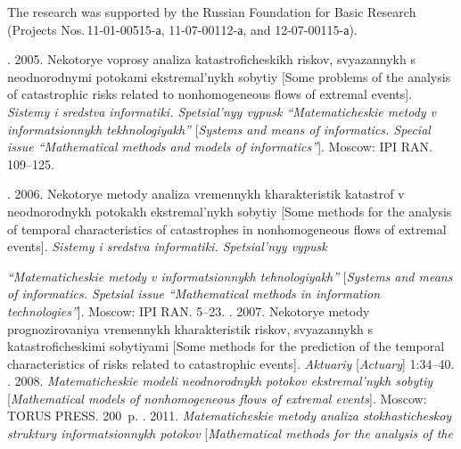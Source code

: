 \Ack
\noindent
The research was supported by the Russian Foundation for Basic Research (Projects 
Nos.\,11-01-00515-а, 11-07-00112-а, and 12-07-00115-а).


  \begin{multicols}{2}

\renewcommand{\bibname}{\protect\rmfamily References}

{\small\frenchspacing
{%
\begin{thebibliography}{99}

. 2005. 
Nekotorye voprosy analiza katastroficheskikh riskov, svyazannykh s neodnorodnymi 
potokami ekstremal'nykh sobytiy [Some problems of the analysis of catastrophic 
risks related to \mbox{nonhomogeneous} flows of extremal events]. 
\textit{Sistemy i sredstva informatiki. Spetsial'nyy vypusk 
``Matematicheskie metody v informatsionnykh tekhnologiyakh''}
[\textit{Systems and means of informatics. 
Special issue ``Mathematical methods and models of informatics''}]. 
Moscow: IPI RAN. 109--125.

. 
2006. Nekotorye metody analiza vremennykh kharakteristik katastrof v 
neodnorodnykh potokakh ekstremal'nykh sobytiy [Some methods for the 
analysis of temporal characteristics of catastrophes in nonhomogeneous 
flows of extremal
 events]. 
\textit{Sistemy i sredstva informatiki. Spetsial'nyy vypusk}\linebreak\vspace*{-12pt} 

\columnbreak

\noindent
\textit{``Matematicheskie metody v informatsionnykh tehnologiyakh''}
[\textit{Systems and means of informatics. Spetsial issue ``Mathematical 
methods in information technologies''}]. Moscow: IPI RAN. 5--23.
. 2007. 
Nekotorye metody prognozirovaniya vremennykh kha\-rak\-te\-ri\-stik riskov, svyazannykh s 
katastroficheskimi sobytiyami 
[Some methods for the prediction of the temporal characteristics of risks related 
to catastrophic events]. \textit{Aktuariy} [\textit{Actuary}] 1:34--40.
. 2008. 
\textit{Matema\-ti\-che\-skie modeli neodnorodnykh potokov ekstremal'nykh sobytiy} 
[\textit{Mathematical models of nonhomogeneous flows of extremal events}]. Moscow: TORUS PRESS.
200~p.
. 2011. 
\textit{Matematicheskie metody analiza stokhasticheskoy struktury infor\-ma\-tsi\-on\-nykh potokov} 
[\textit{Mathematical methods for the analysis of the}\linebreak\vspace*{-12pt}


\end{thebibliography}}}
\end{multicols}
